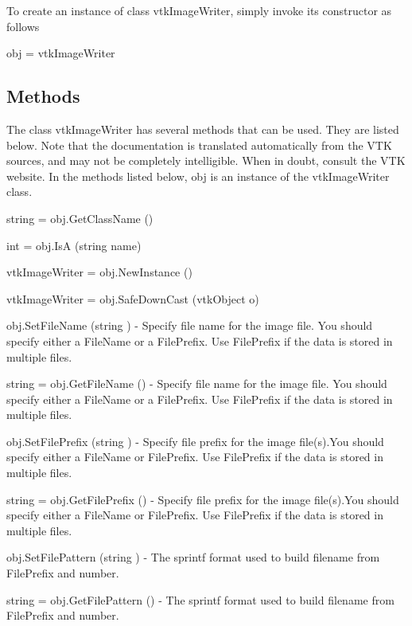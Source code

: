 To create an instance of class vtk\-Image\-Writer, simply invoke its constructor as follows \begin{DoxyVerb}  obj = vtkImageWriter
\end{DoxyVerb}
 \hypertarget{vtkwidgets_vtkxyplotwidget_Methods}{}\subsection{Methods}\label{vtkwidgets_vtkxyplotwidget_Methods}
The class vtk\-Image\-Writer has several methods that can be used. They are listed below. Note that the documentation is translated automatically from the V\-T\-K sources, and may not be completely intelligible. When in doubt, consult the V\-T\-K website. In the methods listed below, {\ttfamily obj} is an instance of the vtk\-Image\-Writer class. 
\begin{DoxyItemize}
\item {\ttfamily string = obj.\-Get\-Class\-Name ()}  
\item {\ttfamily int = obj.\-Is\-A (string name)}  
\item {\ttfamily vtk\-Image\-Writer = obj.\-New\-Instance ()}  
\item {\ttfamily vtk\-Image\-Writer = obj.\-Safe\-Down\-Cast (vtk\-Object o)}  
\item {\ttfamily obj.\-Set\-File\-Name (string )} -\/ Specify file name for the image file. You should specify either a File\-Name or a File\-Prefix. Use File\-Prefix if the data is stored in multiple files.  
\item {\ttfamily string = obj.\-Get\-File\-Name ()} -\/ Specify file name for the image file. You should specify either a File\-Name or a File\-Prefix. Use File\-Prefix if the data is stored in multiple files.  
\item {\ttfamily obj.\-Set\-File\-Prefix (string )} -\/ Specify file prefix for the image file(s).You should specify either a File\-Name or File\-Prefix. Use File\-Prefix if the data is stored in multiple files.  
\item {\ttfamily string = obj.\-Get\-File\-Prefix ()} -\/ Specify file prefix for the image file(s).You should specify either a File\-Name or File\-Prefix. Use File\-Prefix if the data is stored in multiple files.  
\item {\ttfamily obj.\-Set\-File\-Pattern (string )} -\/ The sprintf format used to build filename from File\-Prefix and number.  
\item {\ttfamily string = obj.\-Get\-File\-Pattern ()} -\/ The sprintf format used to build filename from File\-Prefix and number.  

\end{DoxyItemize}
